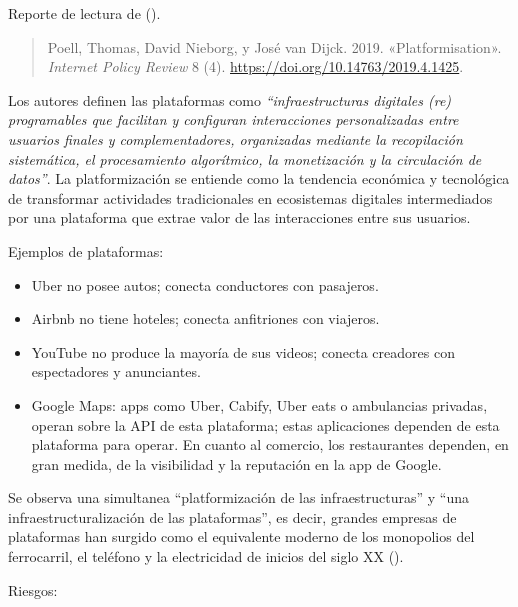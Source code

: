 \documentclass[
  letterpaper,
  DIV=11,
  numbers=noendperiod]{scrreprt}
\providecommand{\tightlist}{%
  \setlength{\itemsep}{0pt}\setlength{\parskip}{0pt}}\usepackage{longtable,booktabs,array}
\begin{document}
Reporte de lectura de ().

\begin{quote}
Poell, Thomas, David Nieborg, y José van Dijck. 2019. «Platformisation».
\emph{Internet Policy Review} 8 (4).
\url{https://doi.org/10.14763/2019.4.1425}.
\end{quote}

Los autores definen las plataformas como \emph{``infraestructuras
digitales (re) programables que facilitan y configuran interacciones
personalizadas entre usuarios finales y complementadores, organizadas
mediante la recopilación sistemática, el procesamiento algorítmico, la
monetización y la circulación de datos''}. La platformización se
entiende como la tendencia económica y tecnológica de transformar
actividades tradicionales en ecosistemas digitales intermediados por una
plataforma que extrae valor de las interacciones entre sus usuarios.

Ejemplos de plataformas:

\begin{itemize}
\tightlist
\item
  Uber no posee autos; conecta conductores con pasajeros.
\item
  Airbnb no tiene hoteles; conecta anfitriones con viajeros.
\item
  YouTube no produce la mayoría de sus videos; conecta creadores con
  espectadores y anunciantes.
\item
  Google Maps: apps como Uber, Cabify, Uber eats o ambulancias privadas,
  operan sobre la API de esta plataforma; estas aplicaciones dependen de
  esta plataforma para operar. En cuanto al comercio, los restaurantes
  dependen, en gran medida, de la visibilidad y la reputación en la app
  de Google.
\end{itemize}

Se observa una simultanea ``platformización de las infraestructuras'' y
``una infraestructuralización de las plataformas'', es decir, grandes
empresas de plataformas han surgido como el equivalente moderno de los
monopolios del ferrocarril, el teléfono y la electricidad de inicios del
siglo XX ().

Riesgos:
\end{document}
